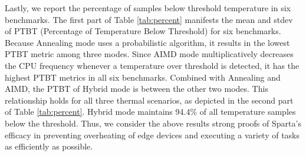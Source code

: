 Lastly, we report the percentage of samples below threshold temperature in six benchmarks. The first part of Table \ref{tab:percent} manifests the mean and stdev of PTBT (Percentage of Temperature Below Threshold) for six benchmarks. Because Annealing mode uses a probabilistic algorithm, it results in the lowest PTBT metric among three modes. Since AIMD mode multiplicatively decreases the CPU frequency whenever a temperature over threshold is detected, it has the highest PTBT metrics in all six benchmarks. Combined with Annealing and AIMD, the PTBT of Hybrid mode is between the other two modes. This relationship holds for all three thermal scenarios, as depicted in the second part of Table \ref{tab:percent}. Hybrid mode maintains 94.4\% of all temperature samples below the threshold. Thus, we consider the above results strong proofs of Sparta's efficacy in preventing overheating of edge devices and executing a variety of tasks as efficiently as possible.





